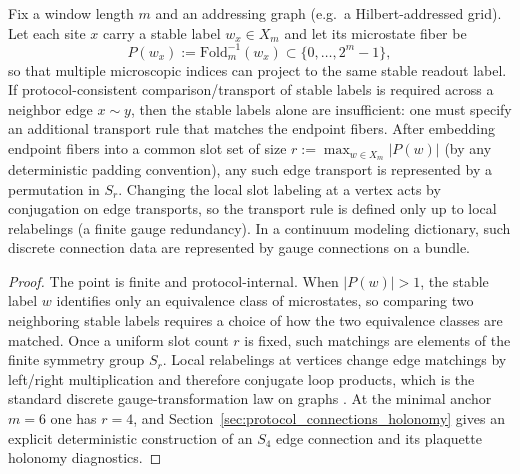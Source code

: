 \begin{proposition}
\label{ax:gauge_compensation}
Fix a window length $m$ and an addressing graph (e.g.\ a Hilbert-addressed grid).
Let each site $x$ carry a stable label $w_x\in X_m$ and let its microstate fiber be
\[
P(w_x):=\mathrm{Fold}_m^{-1}(w_x)\subset\{0,\dots,2^m-1\},
\]
so that multiple microscopic indices can project to the same stable readout label.
If protocol-consistent comparison/transport of stable labels is required across a neighbor edge $x\sim y$, then the stable labels alone are insufficient: one must specify an additional transport rule that matches the endpoint fibers.
After embedding endpoint fibers into a common slot set of size $r:=\max_{w\in X_m}|P(w)|$ (by any deterministic padding convention), any such edge transport is represented by a permutation in $S_r$.
Changing the local slot labeling at a vertex acts by conjugation on edge transports, so the transport rule is defined only up to local relabelings (a finite gauge redundancy).
In a continuum modeling dictionary, such discrete connection data are represented by gauge connections on a bundle.
\end{proposition}
\begin{proof}
The point is finite and protocol-internal.
When $|P(w)|>1$, the stable label $w$ identifies only an equivalence class of microstates, so comparing two neighboring stable labels requires a choice of how the two equivalence classes are matched.
Once a uniform slot count $r$ is fixed, such matchings are elements of the finite symmetry group $S_r$.
Local relabelings at vertices change edge matchings by left/right multiplication and therefore conjugate loop products, which is the standard discrete gauge-transformation law on graphs \cite{Wilson1974,Rothe2012}.
At the minimal anchor $m=6$ one has $r=4$, and Section~\ref{sec:protocol_connections_holonomy} gives an explicit deterministic construction of an $S_4$ edge connection and its plaquette holonomy diagnostics.
\end{proof}

